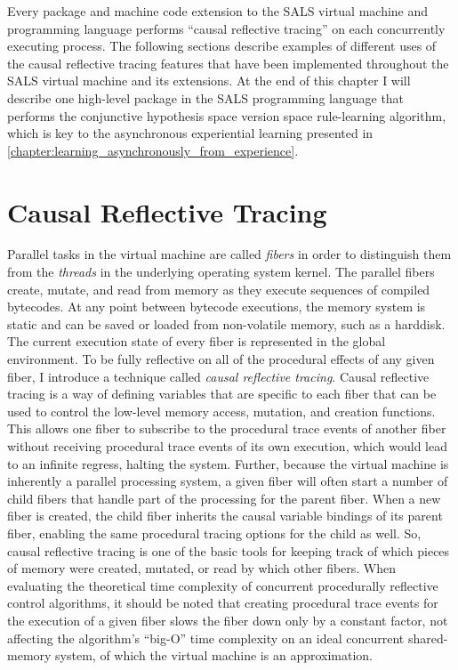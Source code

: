 Every package and machine code extension to the SALS virtual machine
and programming language performs ``causal reflective tracing'' on
each concurrently executing process.  The following sections describe
examples of different uses of the causal reflective tracing features
that have been implemented throughout the SALS virtual machine and its
extensions.  At the end of this chapter I will describe one high-level
package in the SALS programming language that performs the conjunctive
hypothesis space version space rule-learning algorithm, which is key
to the asynchronous experiential learning presented in
{\mbox{\autoref{chapter:learning_asynchronously_from_experience}}}.

\section{Causal Reflective Tracing}

Parallel tasks in the virtual machine are called {\emph{fibers}} in
order to distinguish them from the {\emph{threads}} in the underlying
operating system kernel.  The parallel fibers create, mutate, and read
from memory as they execute sequences of compiled bytecodes.  At any
point between bytecode executions, the memory system is static and can
be saved or loaded from non-volatile memory, such as a harddisk.  The
current execution state of every fiber is represented in the global
environment.  To be fully reflective on all of the procedural effects
of any given fiber, I introduce a technique called {\emph{causal
    reflective tracing}}.  Causal reflective tracing is a way of
defining variables that are specific to each fiber that can be used to
control the low-level memory access, mutation, and creation functions.
This allows one fiber to subscribe to the procedural trace events of
another fiber without receiving procedural trace events of its own
execution, which would lead to an infinite regress, halting the
system.  Further, because the virtual machine is inherently a parallel
processing system, a given fiber will often start a number of child
fibers that handle part of the processing for the parent fiber.  When
a new fiber is created, the child fiber inherits the causal variable
bindings of its parent fiber, enabling the same procedural tracing
options for the child as well.  So, causal reflective tracing is one
of the basic tools for keeping track of which pieces of memory were
created, mutated, or read by which other fibers.  When evaluating the
theoretical time complexity of concurrent procedurally reflective
control algorithms, it should be noted that creating procedural trace
events for the execution of a given fiber slows the fiber down only by
a constant factor, not affecting the algorithm's ``big-O'' time
complexity on an ideal concurrent shared-memory system, of which the
virtual machine is an approximation.


